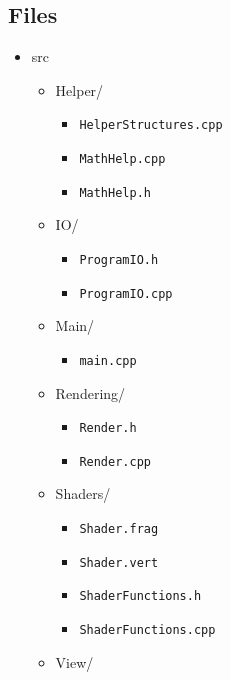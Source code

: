 \documentclass[a4paper,11pt]{article}
\begin{document}
        \subsection{Files}
        \begin{itemize}
        \item src
            \begin{itemize}
            \item Helper/
                \begin{itemize}
                    \item \texttt{HelperStructures.cpp}
                    \item \texttt{MathHelp.cpp}
                    \item \texttt{MathHelp.h}
                \end{itemize}
            \item IO/
                \begin{itemize}
                    \item \texttt{ProgramIO.h}
                    \item \texttt{ProgramIO.cpp}
                \end{itemize}
            \item Main/
                \begin{itemize}
                    \item \texttt{main.cpp}
                \end{itemize}
            \item Rendering/
                \begin{itemize}
                    \item \texttt{Render.h}
                    \item \texttt{Render.cpp}
                \end{itemize}
            \item Shaders/
                \begin{itemize}
                    \item \texttt{Shader.frag}
                    \item \texttt{Shader.vert}
                    \item \texttt{ShaderFunctions.h}
                    \item \texttt{ShaderFunctions.cpp}
                \end{itemize}
            \item View/
                \begin{itemize}

\end{itemize}
\end{itemize}
\end{itemize}
\end{document}
